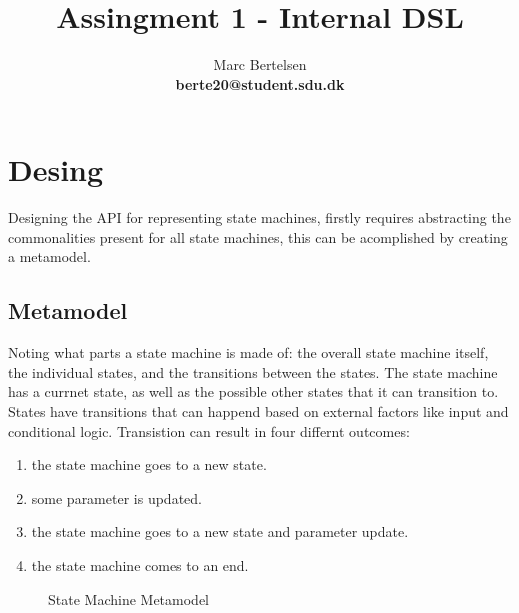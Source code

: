 \documentclass{article}
\begin{document}
\title{Assingment 1 - Internal DSL}
\author{Marc Bertelsen\\
\textbf{berte20@student.sdu.dk}}

\maketitle

\pagebreak

\section{Desing}

Designing the API for representing state machines, firstly requires abstracting the commonalities present for all state machines, this can be acomplished by creating a metamodel.

\subsection{Metamodel}

Noting what parts a state machine is made of: the overall state machine itself, the individual states, and the transitions between the states. The state machine has a currnet state, as well as the possible other states that it can transition to. States have transitions that can happend based on external factors like input and conditional logic. Transistion can result in four differnt outcomes:

\begin{enumerate}
    \item the state machine goes to a new state.
    \item some parameter is updated.
    \item the state machine goes to a new state and parameter update.
    \item the state machine comes to an end.
\end{enumerate}

\begin{figure}[H]
    \centering
    \caption{State Machine Metamodel}
\end{figure}
\end{document}
